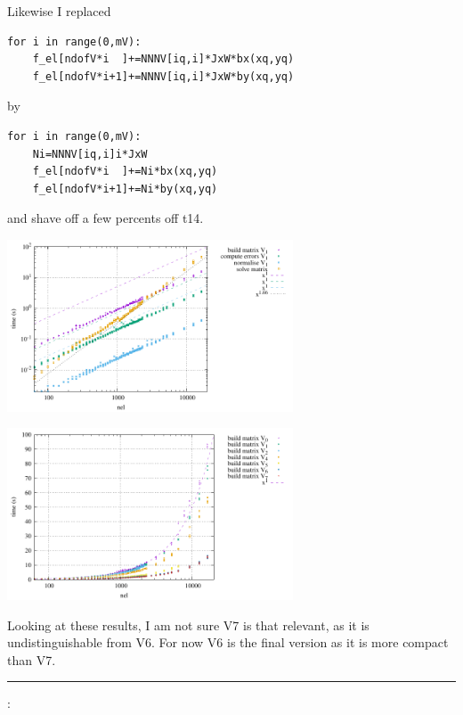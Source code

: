 Likewise I replaced
\begin{lstlisting}
for i in range(0,mV):
    f_el[ndofV*i  ]+=NNNV[iq,i]*JxW*bx(xq,yq)
    f_el[ndofV*i+1]+=NNNV[iq,i]*JxW*by(xq,yq)
\end{lstlisting}
by 
\begin{lstlisting}
for i in range(0,mV):
    Ni=NNNV[iq,i]i*JxW
    f_el[ndofV*i  ]+=Ni*bx(xq,yq)
    f_el[ndofV*i+1]+=Ni*by(xq,yq)
\end{lstlisting}
and shave off a few percents off t14.

\begin{center}
\includegraphics[width=8.5cm]{python_codes/fieldstone_150/results/times_V7}
\end{center}

\begin{center}
\includegraphics[width=8.5cm]{python_codes/fieldstone_150/results/times_build_all}
\end{center}
Looking at these results, I am not sure V7 is that relevant, as it is 
undistinguishable from V6.
For now V6 is the final version as it is more compact than V7. 


\par\noindent\rule{\textwidth}{0.4pt}

\vspace{.5cm}

\begin{center}
\end{center}

\vspace{.5cm}

\Literature:\\
\\


